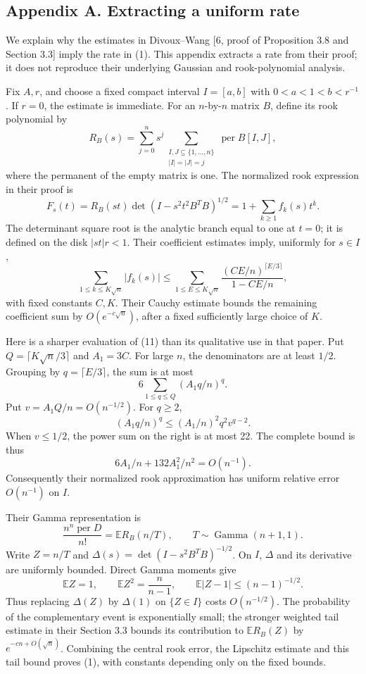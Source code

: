 \documentclass[
  11pt,
]{article}
\begin{document}
\subsection{Appendix A. Extracting a uniform
rate}\label{appendix-a.-extracting-a-uniform-rate}

We explain why the estimates in Divoux--Wang {[}6, proof of Proposition
3.8 and Section 3.3{]} imply the rate in (1). This appendix extracts a
rate from their proof; it does not reproduce their underlying Gaussian
and rook-polynomial analysis.

Fix \(A,r\), and choose a fixed compact interval \(I=[a,b]\) with
\(0<a<1<b<r^{-1}\). If \(r=0\), the estimate is immediate. For an
\(n\)-by-\(n\) matrix \(B\), define its rook polynomial by \[
 R_B(s)=\sum_{j=0}^n s^j
   \sum_{\substack{I,J\subseteq\{1,\ldots,n\}\\ |I|=|J|=j}}
     \operatorname{per}B[I,J],
\] where the permanent of the empty matrix is one. The normalized rook
expression in their proof is \[
 F_s(t)=R_B(st)\det(I-s^2t^2B^TB)^{1/2}
       =1+\sum_{k\ge1}f_k(s)t^k.
\] The determinant square root is the analytic branch equal to one at
\(t=0\); it is defined on the disk \(|st|r<1\). Their coefficient
estimates imply, uniformly for \(s\in I\), \[
 \sum_{1\le k\le K\sqrt n}|f_k(s)|
 \le\sum_{1\le E\le K\sqrt n}
       \frac{(CE/n)^{\lceil E/3\rceil}}{1-CE/n},           \tag{11}
\] with fixed constants \(C,K\). Their Cauchy estimate bounds the
remaining coefficient sum by \(O(e^{-c\sqrt n})\), after a fixed
sufficiently large choice of \(K\).

Here is a sharper evaluation of (11) than its qualitative use in that
paper. Put \(Q=\lceil K\sqrt n/3\rceil\) and \(A_1=3C\). For large
\(n\), the denominators are at least \(1/2\). Grouping by
\(q=\lceil E/3\rceil\), the sum is at most \[
 6\sum_{1\le q\le Q}(A_1q/n)^q.
\] Put \(v=A_1Q/n=O(n^{-1/2})\). For \(q\ge2\), \[
 (A_1q/n)^q\le(A_1/n)^2q^2v^{q-2}.
\] When \(v\le1/2\), the power sum on the right is at most 22. The
complete bound is thus \[
 6A_1/n+132A_1^2/n^2=O(n^{-1}).
\] Consequently their normalized rook approximation has uniform relative
error \(O(n^{-1})\) on \(I\).

Their Gamma representation is \[
 \frac{n^n\operatorname{per}D}{n!}=\mathbb E R_B(n/T),
 \qquad T\sim\operatorname{Gamma}(n+1,1).
\] Write \(Z=n/T\) and \(\Delta(s)=\det(I-s^2B^TB)^{-1/2}\). On \(I\),
\(\Delta\) and its derivative are uniformly bounded. Direct Gamma
moments give \[
 \mathbb EZ=1,\qquad\mathbb EZ^2=\frac n{n-1},\qquad
 \mathbb E|Z-1|\le(n-1)^{-1/2}.
\] Thus replacing \(\Delta(Z)\) by \(\Delta(1)\) on \(\{Z\in I\}\) costs
\(O(n^{-1/2})\). The probability of the complementary event is
exponentially small; the stronger weighted tail estimate in their
Section 3.3 bounds its contribution to \(\mathbb ER_B(Z)\) by
\(e^{-cn+O(\sqrt n)}\). Combining the central rook error, the Lipschitz
estimate and this tail bound proves (1), with constants depending only
on the fixed bounds.
\end{document}
